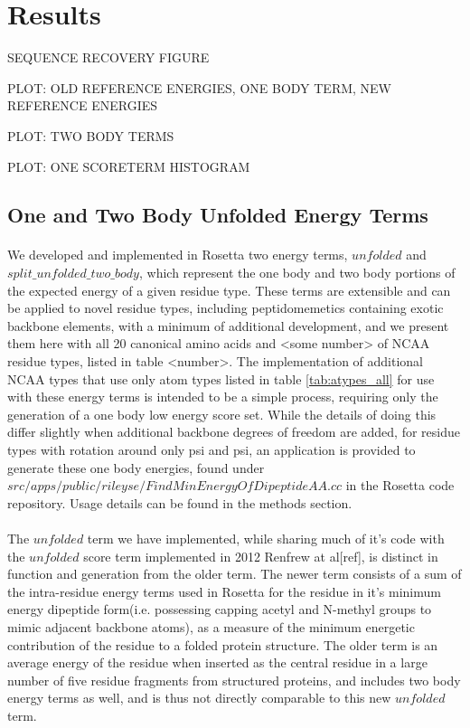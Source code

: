 \section{Results}
SEQUENCE RECOVERY FIGURE

PLOT: OLD REFERENCE ENERGIES, ONE BODY TERM, NEW REFERENCE ENERGIES

PLOT: TWO BODY TERMS

PLOT: ONE SCORETERM HISTOGRAM

\subsection{One and Two Body Unfolded Energy Terms}
\paragraph{}
We developed and implemented in Rosetta two energy terms, $unfolded$ and $split\_unfolded\_two\_body$, which represent the one body and two body portions of the expected energy of a given residue type.
These terms are extensible and can be applied to novel residue types, including peptidomemetics containing exotic backbone elements, with a minimum of additional development, and we present them here with all 20 canonical amino acids and <some number> of NCAA residue types, listed in table <number>.
The implementation of additional NCAA types that use only atom types listed in table \ref{tab:atypes_all} for use with these energy terms is intended to be a simple process, requiring only the generation of a one body low energy score set.
While the details of doing this differ slightly when additional backbone degrees of freedom are added, for residue types with rotation around only psi and psi, an application is provided to generate these one body energies, found under $src/apps/public/rileyse/FindMinEnergyOfDipeptideAA.cc$ in the Rosetta code repository.
Usage details can be found in the methods section.

\paragraph{}
The $unfolded$ term we have implemented, while sharing much of it's code with the $unfolded$ score term implemented in 2012 Renfrew at al[ref], is distinct in function and generation from the older term.
The newer term consists of a sum of the intra-residue energy terms used in Rosetta for the residue in it's minimum energy dipeptide form(i.e. possessing capping acetyl and N-methyl groups to mimic adjacent backbone atoms), as a measure of the minimum energetic contribution of the residue to a folded protein structure.
The older term is an average energy of the residue when inserted as the central residue in a large number of five residue fragments from structured proteins, and includes two body energy terms as well, and is thus not directly comparable to this new $unfolded$ term.

